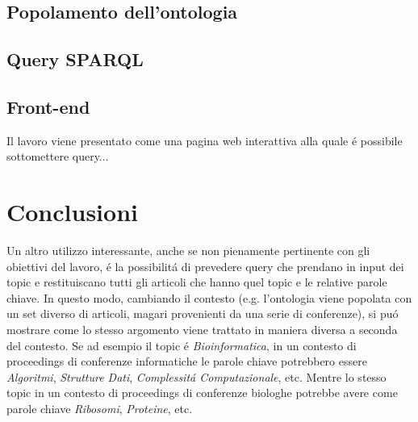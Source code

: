 \documentclass[11pt,twoside,a4paper]{article}
\begin{document}






\subsection{Popolamento dell'ontologia}

\subsection{Query SPARQL}

\subsection{Front-end}
Il lavoro viene presentato come una pagina web interattiva alla quale \'e possibile sottomettere query...

\section{Conclusioni}
\label{sec:conclusions}
Un altro utilizzo interessante, anche se non pienamente pertinente con gli obiettivi del lavoro, \'e la possibilit\'a di prevedere query che prendano in input dei topic e restituiscano tutti gli articoli che hanno quel topic e le relative parole chiave. In questo modo, cambiando il contesto (e.g. l'ontologia viene popolata con un set diverso di articoli, magari provenienti da una serie di conferenze), si pu\'o mostrare come lo stesso argomento viene trattato in maniera diversa a seconda del contesto. Se ad esempio il topic \'e \emph{Bioinformatica}, in un contesto di proceedings di conferenze informatiche le parole chiave potrebbero essere \emph{Algoritmi}, \emph{Strutture Dati}, \emph{Complessit\'a Computazionale}, etc. Mentre lo stesso topic in un contesto di proceedings di conferenze biologhe potrebbe avere come parole chiave \emph{Ribosomi}, \emph{Proteine}, etc. 
\end{document}
